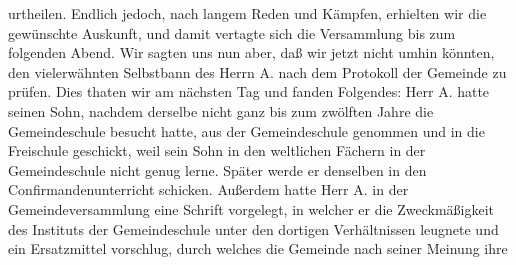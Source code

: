 urtheilen. Endlich jedoch, nach langem Reden und Kämpfen, erhielten wir die gewünschte Auskunft, und damit vertagte sich die Versammlung bis zum folgenden Abend. Wir sagten uns nun aber, daß wir jetzt nicht umhin könnten, den vielerwähnten Selbstbann des Herrn A. nach dem Protokoll der Gemeinde zu prüfen. Dies thaten wir am nächsten Tag und fanden Folgendes: Herr A. hatte seinen Sohn, nachdem derselbe nicht ganz bis zum zwölften Jahre die Gemeindeschule besucht hatte, aus der Gemeindeschule genommen und in die Freischule geschickt, weil sein Sohn in den weltlichen Fächern in der Gemeindeschule nicht genug lerne. Später werde er denselben in den Confirmandenunterricht schicken. Außerdem hatte Herr A. in der Gemeindeversammlung eine Schrift vorgelegt, in welcher er die Zweckmäßigkeit des Instituts der Gemeindeschule unter den dortigen Verhältnissen leugnete und ein Ersatzmittel vorschlug, durch welches die Gemeinde nach seiner Meinung ihre
